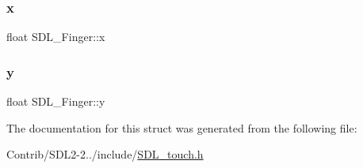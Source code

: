 \mbox{\label{struct_s_d_l___finger_ab91dfbd03c3215560457fef44e1c7755}} 
\subsubsection{\texorpdfstring{x}{x}}
{\footnotesize\ttfamily float S\+D\+L\+\_\+\+Finger\+::x}

\mbox{\label{struct_s_d_l___finger_a0a2c7a06ae641940111e03801c672cf9}} 
\subsubsection{\texorpdfstring{y}{y}}
{\footnotesize\ttfamily float S\+D\+L\+\_\+\+Finger\+::y}



The documentation for this struct was generated from the following file\+:\begin{DoxyCompactItemize}
\item 
Contrib/\+S\+D\+L2-\/2../include/\mbox{\hyperlink{_s_d_l__touch_8h}{S\+D\+L\+\_\+touch.\+h}}\end{DoxyCompactItemize}
